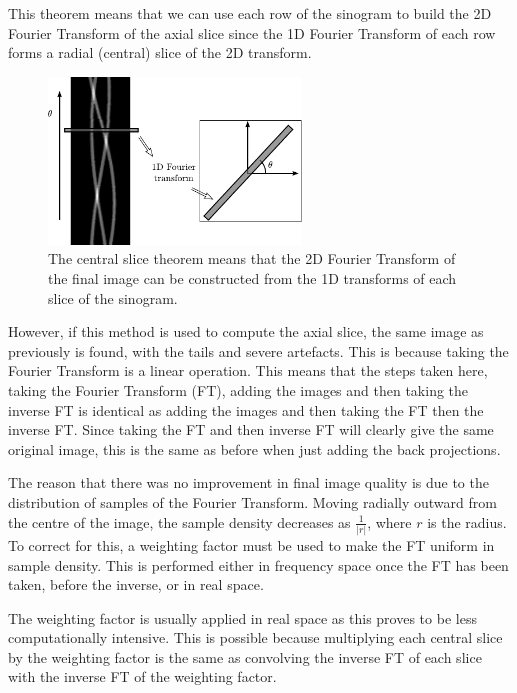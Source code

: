     This theorem means that we can use each row of the sinogram to build the 2D Fourier Transform of the axial slice since the 1D Fourier Transform of each row forms a radial (central) slice of the 2D transform.
    \begin{figure}[ht]
        \begin{center}
            \includegraphics[width=0.6\textwidth]{Files/report_images/central_slice_theorem.pdf}
        \end{center}
        \caption{The central slice theorem means that the 2D Fourier Transform of the final image can be constructed from the 1D transforms of each slice of the sinogram.\label{fig:central_slice_theorem}}
    \end{figure}

    However, if this method is used to compute the axial slice, the same image as previously is found, with the tails and severe artefacts. This is because taking the Fourier Transform is a linear operation. This means that the steps taken here, taking the Fourier Transform (FT), adding the images and then taking the inverse FT is identical as adding the images and then taking the FT then the inverse FT. Since taking the FT and then inverse FT will clearly give the same original image, this is the same as before when just adding the back projections.

    The reason that there was no improvement in  final image quality is due to the distribution of samples of the Fourier Transform. Moving radially outward from the centre of the image, the sample density decreases as $\frac{1}{|r|}$, where $r$ is the radius. To correct for this, a weighting factor must be used to make the FT uniform in sample density. This is performed either in frequency space once the FT has been taken, before the inverse, or in real space.

    The weighting factor is usually applied in real space as this proves to be less computationally intensive. This is possible because multiplying each central slice by the weighting factor is the same as convolving the inverse FT of each slice with the inverse FT of the weighting factor. 

